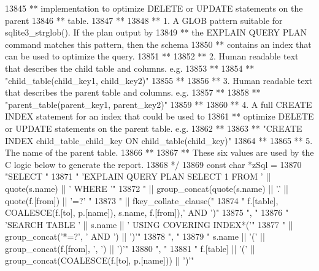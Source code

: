 \begin{DoxyCode}
13845 \textcolor{comment}{  **    implementation to optimize DELETE or UPDATE statements on the parent}
13846 \textcolor{comment}{  **    table.}
13847 \textcolor{comment}{  **}
13848 \textcolor{comment}{  ** 1. A GLOB pattern suitable for sqlite3\_strglob(). If the plan output by}
13849 \textcolor{comment}{  **    the EXPLAIN QUERY PLAN command matches this pattern, then the schema}
13850 \textcolor{comment}{  **    contains an index that can be used to optimize the query.}
13851 \textcolor{comment}{  **}
13852 \textcolor{comment}{  ** 2. Human readable text that describes the child table and columns. e.g.}
13853 \textcolor{comment}{  **}
13854 \textcolor{comment}{  **       "child\_table(child\_key1, child\_key2)"}
13855 \textcolor{comment}{  **}
13856 \textcolor{comment}{  ** 3. Human readable text that describes the parent table and columns. e.g.}
13857 \textcolor{comment}{  **}
13858 \textcolor{comment}{  **       "parent\_table(parent\_key1, parent\_key2)"}
13859 \textcolor{comment}{  **}
13860 \textcolor{comment}{  ** 4. A full CREATE INDEX statement for an index that could be used to}
13861 \textcolor{comment}{  **    optimize DELETE or UPDATE statements on the parent table. e.g.}
13862 \textcolor{comment}{  **}
13863 \textcolor{comment}{  **       "CREATE INDEX child\_table\_child\_key ON child\_table(child\_key)"}
13864 \textcolor{comment}{  **}
13865 \textcolor{comment}{  ** 5. The name of the parent table.}
13866 \textcolor{comment}{  **}
13867 \textcolor{comment}{  ** These six values are used by the C logic below to generate the report.}
13868 \textcolor{comment}{  */}
13869   \textcolor{keyword}{const} \textcolor{keywordtype}{char} *zSql =
13870   \textcolor{stringliteral}{"SELECT "}
13871     \textcolor{stringliteral}{"     'EXPLAIN QUERY PLAN SELECT 1 FROM ' || quote(s.name) || ' WHERE '"}
13872     \textcolor{stringliteral}{"  || group\_concat(quote(s.name) || '.' || quote(f.[from]) || '=?' "}
13873     \textcolor{stringliteral}{"  || fkey\_collate\_clause("}
13874     \textcolor{stringliteral}{"       f.[table], COALESCE(f.[to], p.[name]), s.name, f.[from]),' AND ')"}
13875     \textcolor{stringliteral}{", "}
13876     \textcolor{stringliteral}{"     'SEARCH TABLE ' || s.name || ' USING COVERING INDEX*('"}
13877     \textcolor{stringliteral}{"  || group\_concat('*=?', ' AND ') || ')'"}
13878     \textcolor{stringliteral}{", "}
13879     \textcolor{stringliteral}{"     s.name  || '(' || group\_concat(f.[from],  ', ') || ')'"}
13880     \textcolor{stringliteral}{", "}
13881     \textcolor{stringliteral}{"     f.[table] || '(' || group\_concat(COALESCE(f.[to], p.[name])) || ')'"}

\end{DoxyCode}
